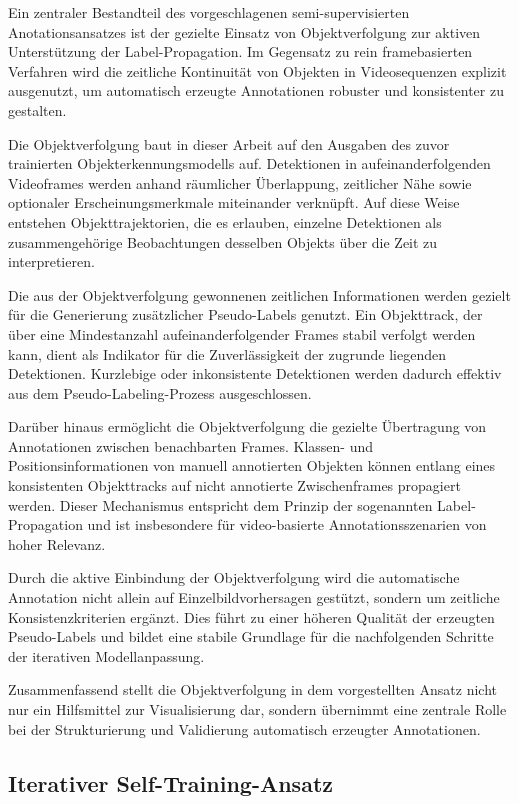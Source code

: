 Ein zentraler Bestandteil des vorgeschlagenen semi-supervisierten 
Anotationsansatzes ist der gezielte Einsatz von Objektverfolgung zur aktiven 
Unterstützung der Label-Propagation. Im Gegensatz zu rein framebasierten 
Verfahren wird die zeitliche Kontinuität von Objekten in Videosequenzen explizit 
ausgenutzt, um automatisch erzeugte Annotationen robuster und konsistenter zu 
gestalten.

Die Objektverfolgung baut in dieser Arbeit auf den Ausgaben des zuvor trainierten 
Objekterkennungsmodells auf. Detektionen in aufeinanderfolgenden Videoframes werden 
anhand räumlicher Überlappung, zeitlicher Nähe sowie optionaler 
Erscheinungsmerkmale miteinander verknüpft. Auf diese Weise entstehen 
Objekttrajektorien, die es erlauben, einzelne Detektionen als zusammengehörige 
Beobachtungen desselben Objekts über die Zeit zu interpretieren.

Die aus der Objektverfolgung gewonnenen zeitlichen Informationen werden gezielt 
für die Generierung zusätzlicher Pseudo-Labels genutzt. Ein Objekttrack, der über 
eine Mindestanzahl aufeinanderfolgender Frames stabil verfolgt werden kann, dient 
als Indikator für die Zuverlässigkeit der zugrunde liegenden Detektionen. 
Kurzlebige oder inkonsistente Detektionen werden dadurch effektiv aus dem 
Pseudo-Labeling-Prozess ausgeschlossen.

Darüber hinaus ermöglicht die Objektverfolgung die gezielte Übertragung von 
Annotationen zwischen benachbarten Frames. Klassen- und Positionsinformationen 
von manuell annotierten Objekten können entlang eines konsistenten Objekttracks 
auf nicht annotierte Zwischenframes propagiert werden. Dieser Mechanismus 
entspricht dem Prinzip der sogenannten Label-Propagation und ist insbesondere 
für video-basierte Annotationsszenarien von hoher Relevanz.

Durch die aktive Einbindung der Objektverfolgung wird die automatische Annotation 
nicht allein auf Einzelbildvorhersagen gestützt, sondern um zeitliche 
Konsistenzkriterien ergänzt. Dies führt zu einer höheren Qualität der erzeugten 
Pseudo-Labels und bildet eine stabile Grundlage für die nachfolgenden Schritte 
der iterativen Modellanpassung.

Zusammenfassend stellt die Objektverfolgung in dem vorgestellten Ansatz nicht nur 
ein Hilfsmittel zur Visualisierung dar, sondern übernimmt eine zentrale Rolle bei 
der Strukturierung und Validierung automatisch erzeugter Annotationen.

\subsection{Iterativer Self-Training-Ansatz}

